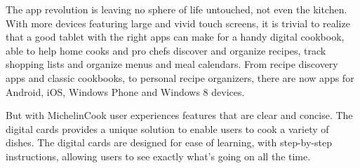 The app revolution is leaving no sphere of life untouched, not even the kitchen. With more devices featuring large and vivid touch screens, it is trivial to realize that a good tablet with the right apps can make for a handy digital cookbook, able to help home cooks and pro chefs discover and organize recipes, track shopping lists and organize menus and meal calendars. From recipe discovery apps and classic cookbooks, to personal recipe organizers, there are now apps for Android, iOS, Windows Phone and Windows 8 devices.

But with MichelinCook user experiences features that are clear and concise. The digital cards provides a unique solution to enable users to cook a variety of dishes. The digital cards are designed for ease of learning, with step-by-step instructions, allowing users to see exactly what's going on all the time.